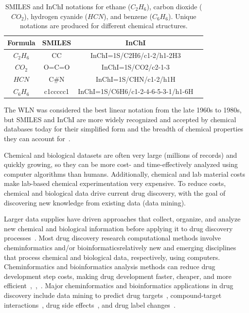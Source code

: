 \documentclass{IEEEtran}
\begin{document}
		\begin{table}[H]
			\begin{center}
				\begin{tabular}{|c|c|c|c|} \hline
					\textbf{Formula} & \textbf{SMILES} & \textbf{InChI} \\ \hline
					$C_2H_6$ & CC & InChI=1S/C2H6/c1-2/h1-2H3   \\ \hline
					$CO_2$ & O=C=O & InChI=1S/CO2/c2-1-3  \\ \hline
					$HCN$ & C\#N & InChI=1S/CHN/c1-2/h1H  \\ \hline
					$C_6H_6$ & c1ccccc1 & InChI=1S/C6H6/c1-2-4-6-5-3-1/h1-6H \\\hline
				\end{tabular}
				\caption{\footnotesize SMILES and InChI notations for ethane ($C_2H_6$), carbon dioxide ($CO_2$), hydrogen cyanide ($HCN$), and benzene ($C_6H_6$).  Unique notations are produced for different chemical structures.}
			\end{center}
		\end{table}
		The WLN was considered the best linear notation from the late 1960s to 1980s, but SMILES and InChI are more widely recognized and accepted by chemical databases today for their simplified form and the breadth of chemical properties they can account for~\cite{xu}. 
		
		Chemical and biological datasets are often very large (millions of records) and quickly growing, so they can be more cost- and time-effectively analyzed using computer algorithms than humans.  Additionally, chemical and lab material costs make lab-based chemical experimentation very expensive.  To reduce costs, chemical and biological data drive current drug discovery, with the goal of discovering new knowledge from existing data (data mining).  
		
		Larger data supplies have driven approaches that collect, organize, and analyze new chemical and biological information before applying it to drug discovery processes~\cite{begam}.  Most drug discovery research computational methods involve cheminformatics and/or bioinformatics\textemdash relatively new and emerging disciplines that process chemical and biological data, respectively, using computers.  Cheminformatics and bioinformatics analysis methods can reduce drug development step costs, making drug development faster, cheaper, and more efficient~\cite{begam},~\cite{brown},~\cite{xu}.  Major cheminformatics and bioinformatics applications in drug discovery include data mining to predict drug targets~\cite{elshi}, compound-target interactions~\cite{keum}, drug side effects~\cite{atias}, and drug label changes~\cite{guru}.
		
\end{document}

